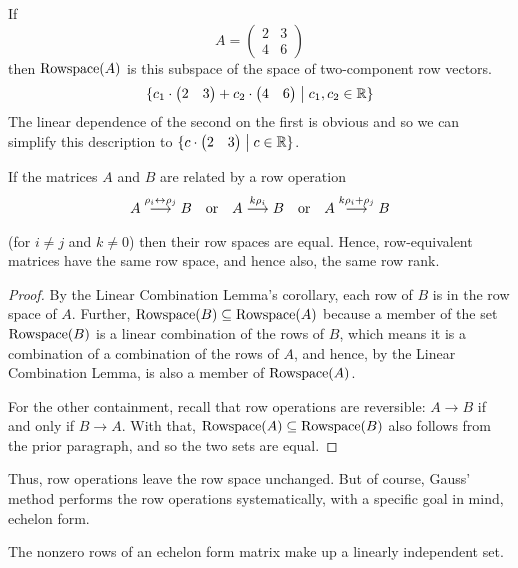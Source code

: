 \begin{example}
If
\begin{equation*}
  A=\begin{pmatrix}
          2  &3  \\
          4  &6
       \end{pmatrix}
\end{equation*}
then \( \mathop{{\mbox{Rowspace}}}(A) \) is this subspace of the space of
two-component row vectors.
\begin{equation*}
   \mbox{$\{c_1\cdot\begin{pmatrix} 2 &3 \end{pmatrix}+c_2\cdot\begin{pmatrix} 4  &6 \end{pmatrix}
          \bigm| c_1,c_2\in\mathbb{R} \}$}
\end{equation*}
The linear dependence of the second on the first is obvious and so we can
simplify this description to 
$\mbox{$\{c\cdot\begin{pmatrix} 2 &3 \end{pmatrix}\bigm| c\in\mathbb{R} \}$}$.
\end{example}

\begin{lemma}     \label{le:RowSpUnchByGR}
If the matrices \( A \) and \( B \) are related by a row operation
\begin{equation*}
  A\mathrel{ \mathop{\longrightarrow}\limits^{\rho_i\leftrightarrow\rho_j\mathstrut}_{ \begin{subarray}{l} \relax \end{subarray}}}B 
  \quad\text{or}\quad
  A\mathrel{ \mathop{\longrightarrow}\limits^{k\rho_i\mathstrut}_{ \begin{subarray}{l} \relax \end{subarray}}}B 
  \quad\text{or}\quad
  A\mathrel{ \mathop{\longrightarrow}\limits^{k\rho_i+\rho_j\mathstrut}_{ \begin{subarray}{l} \relax \end{subarray}}}B
\end{equation*}
(for $i\neq j$ and $k\neq 0$) then their row spaces are equal.
Hence, row-equivalent matrices have the same row space, and hence also,
the same row rank.
\end{lemma}

\begin{proof}
By the Linear Combination Lemma's corollary, 
each row of $B$ is in the row space of $A$.
Further, $\mathop{{\mbox{Rowspace}}}(B)\subseteq\mathop{{\mbox{Rowspace}}}(A)$ because a member of the
set $\mathop{{\mbox{Rowspace}}}(B)$ is a linear combination of the rows of $B$, which means it
is a combination of a combination of the rows of $A$,
and hence, by the Linear Combination Lemma, is also a member of $\mathop{{\mbox{Rowspace}}}(A)$.

For the other containment, 
recall that row operations are reversible:
\mbox{$A\longrightarrow B$} if and only if
\mbox{$B\longrightarrow A$}.
With that,  
$\mathop{{\mbox{Rowspace}}}(A)\subseteq\mathop{{\mbox{Rowspace}}}(B)$ also follows from the prior paragraph, 
and so the two sets are equal.
\end{proof}

Thus, row operations leave the row space unchanged.
But of course, Gauss' method performs the row operations systematically,
with a specific goal in mind, echelon form.

\begin{lemma}  \label{le:RowsEchMatLI}
The nonzero rows of an echelon form matrix make up a linearly independent
set.
\end{lemma}

